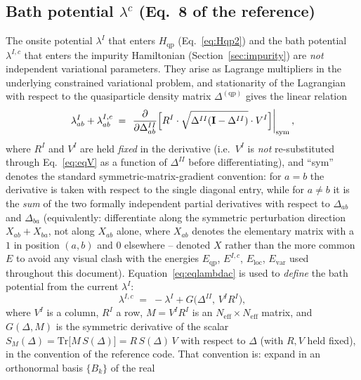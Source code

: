 \documentclass[11pt]{article}
\newcommand{\Neff}{N_{\mathrm{eff}}}
\newcommand{\Hqp}{H_{\mathrm{qp}}}
\begin{document}
\subsection{Bath potential $\lambda^c$ (Eq.~8 of the reference)}
\label{sec:eqlambdac}

The onsite potential $\lambda^{I}$ that enters $\Hqp$
(Eq.~\eqref{eq:Hqp2}) and the bath potential $\lambda^{I,c}$ that enters the
impurity Hamiltonian (Section~\ref{sec:impurity}) are \emph{not} independent
variational parameters. They arise as Lagrange multipliers in the underlying
constrained variational problem, and stationarity of the Lagrangian with
respect to the quasiparticle density matrix $\Delta^{(\mathrm{qp})}$ gives the
linear relation
\begin{equation}
  \lambda^{I}_{ab} + \lambda^{I,c}_{ab}
  \;=\; \left.\frac{\partial}{\partial\Delta^{II}_{ab}}
     \Bigl[R^{I}\cdot\sqrt{\Delta^{II}(\mathbf{I}-\Delta^{II})}\cdot V^{I}\Bigr]\right|_{\mathrm{sym}},
  \label{eq:eqlambdac}
\end{equation}
where $R^{I}$ and $V^{I}$ are held \emph{fixed} in the derivative (i.e.\ $V^I$
is \emph{not} re-substituted through Eq.~\eqref{eq:eqV} as a function of
$\Delta^{II}$ before differentiating), and ``sym'' denotes the standard
symmetric-matrix-gradient convention: for $a=b$ the derivative is taken with
respect to the single diagonal entry, while for $a\neq b$ it is the
\emph{sum} of the two formally independent partial derivatives with respect
to $\Delta_{ab}$ and $\Delta_{ba}$ (equivalently: differentiate along the
symmetric perturbation direction $X_{ab}+X_{ba}$, not along $X_{ab}$ alone,
where $X_{ab}$ denotes the elementary matrix with a $1$ in position $(a,b)$
and $0$ elsewhere -- denoted $X$ rather than the more common $E$ to avoid any
visual clash with the energies $E_{\mathrm{qp}}$, $E^{I,c}$, $E_{\mathrm{loc}}$,
$E_{\mathrm{var}}$ used throughout this document).
Equation~\eqref{eq:eqlambdac} is used to \emph{define} the bath potential
from the current $\lambda^{I}$:
\begin{equation}
  \lambda^{I,c} \;=\; -\lambda^{I} + G\bigl(\Delta^{II},\,V^{I}R^{I}\bigr),
  \label{eq:lambdac-def}
\end{equation}
where $V^I$ is a column, $R^I$ a row, $M=V^IR^I$ is an $\Neff\times\Neff$
matrix, and $G(\Delta,M)$ is the symmetric derivative of the scalar
$S_M(\Delta)=\mathrm{Tr}\bigl[M\,S(\Delta)\bigr]=R\,S(\Delta)\,V$ with respect
to $\Delta$ (with $R,V$ held fixed), in the convention of the reference
code. That convention is: expand in an orthonormal basis $\{B_k\}$ of the real
\end{document}
